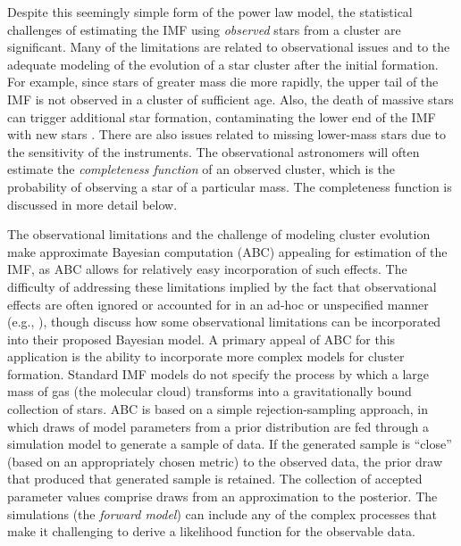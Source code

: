 \documentclass[ejs]{imsart}
\numberwithin{equation}{section}
\theoremstyle{plain}
\begin{document}
Despite this seemingly simple form of the power law model, the statistical challenges of estimating the 
IMF using \emph{observed} stars from a cluster are significant. Many of the limitations are related to 
observational issues and to the adequate modeling of the evolution of a star cluster after the 
initial formation. For example, since stars of greater mass die more rapidly, the upper tail of the IMF is 
not observed in a cluster of sufficient age.  
Also, the death of massive stars can trigger additional star formation,
contaminating the lower end of the IMF with new stars \citep{Woosley2015}.
There are also issues related to missing lower-mass stars due to the sensitivity of the instruments.  The observational astronomers will often estimate the \emph{completeness function} of an observed cluster, which is the probability of observing a star of a particular mass.  The completeness function is discussed in more detail below.




The observational limitations and the challenge of modeling cluster evolution make approximate Bayesian 
computation (ABC) appealing for estimation of the IMF, as ABC allows for relatively easy incorporation of
such effects.  The difficulty of addressing these limitations implied by the fact that observational effects are often ignored or accounted for in an ad-hoc or unspecified manner (e.g., \citealt{DaRioEtAl2012, Ashworth2017, Jose2017, Kalari2018}), though \cite{weisz13} discuss how some observational limitations can be incorporated into their proposed Bayesian model.
A primary appeal of ABC for this application is the ability to incorporate more complex models for cluster
formation. 
Standard IMF models do not specify the process by which
a large mass of gas (the molecular cloud) transforms into a gravitationally bound collection of stars. 
ABC is based on a simple rejection-sampling approach, in which draws of model parameters from a prior 
distribution are fed through a simulation model to generate a sample of data. 
If the generated sample is ``close'' (based on an appropriately chosen metric) to the 
observed data, the prior draw that produced that generated sample is retained. The collection of
accepted parameter values comprise draws from an approximation to the posterior.
The simulations
(the \emph{forward model}) can include any of the complex processes that make it challenging to derive a
likelihood function for the observable data.
\end{document}
